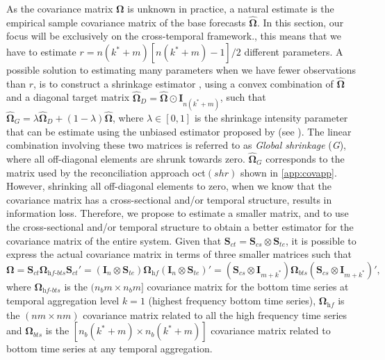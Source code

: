 \documentclass[12pt]{article}
\newcommand{\Ivet}{\bm{I}}
\newcommand{\Svet}{\bm{S}}
\newcommand{\Omegavet}{\bm{\Omega}}
\theoremstyle{definition}
\begin{document}
As the covariance matrix $\Omegavet$ is unknown in practice, a natural estimate is the empirical sample covariance matrix of the base forecasts $\widehat{\Omegavet}$. In this section, our focus will be exclusively on the cross-temporal framework., this means that we have to estimate $r = n(k^\ast+m)[n(k^\ast+m)-1]/2$ different parameters. A possible solution to estimating many parameters when we have fewer observations than $r$, is to construct a shrinkage estimator \citep{efron1975a,efron1975,efron1977}, using a convex combination of $\widehat{\Omegavet}$ and a diagonal target matrix $\widehat{\Omegavet}_D = \widehat{\Omegavet} \odot \Ivet_{n(k^\ast+m)}$, such that $\widehat{\Omegavet}_{G} = \lambda \widehat{\Omegavet}_D + (1-\lambda) \widehat{\Omegavet}$, where $\lambda \in [0,1]$ is the shrinkage intensity parameter that can be estimate using the unbiased estimator proposed by \cite{ledoit2004a} (see \citealp{schafer2005}). The linear combination involving these two matrices is referred to as \textit{Global shrinkage} (\textit{G}), where all off-diagonal elements are shrunk towards zero. $\widehat{\Omegavet}_{G}$ corresponds to the matrix used by the reconciliation approach oct$(shr)$ shown in \autoref{app:covapp}. However, shrinking all off-diagonal elements to zero, when we know that the covariance matrix has a cross-sectional and/or temporal structure, results in information loss. Therefore, we propose to estimate a smaller matrix, and to use the cross-sectional and/or temporal structure to obtain a better estimator for the covariance matrix of the entire system. Given that $\Svet_{ct} = \Svet_{cs} \otimes \Svet_{te}$, it is possible to express the actual covariance matrix in terms of three smaller matrices such that
\begin{equation}
	\label{eq:OmSct}
		\Omegavet = \Svet_{ct}\Omegavet_{\textit{hf-bts}}\Svet_{ct}' = \left(\Ivet_n \otimes \Svet_{te}\right)\Omegavet_{\textit{hf}}\left(\Ivet_n \otimes \Svet_{te}\right)' = \left(\Svet_{cs} \otimes \Ivet_{m+k^\ast}\right)\Omegavet_{bts}\left(\Svet_{cs} \otimes \Ivet_{m+k^\ast}\right)',
\end{equation}
where $\Omegavet_{\textit{hf-bts}}$ is the $(n_b m\times n_b m]$ covariance matrix for the bottom time series at temporal aggregation level $k = 1$ (highest frequency bottom time series), $\Omegavet_{\textit{hf}}$ is the $(nm\times nm)$ covariance matrix related to all the high frequency time series and $\Omegavet_{bts}$ is the $[n_b(k^\ast + m)\times n_b(k^\ast + m)]$ covariance matrix related to bottom time series at any temporal aggregation.
\end{document}
